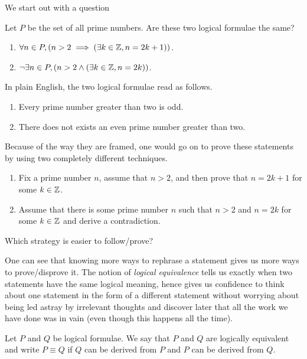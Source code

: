 We start out with a question
\begin{question}
    Let $P$ be the set of all prime numbers.
   Are these two logical formulae the same?
   \begin{enumerate}
       \item $\forall n \in P, (n> 2 \implies (\exists k \in \mathbb{Z}, n = 2k+ 1))$.
       \item $\neg \exists n \in P, (n> 2 \wedge ( \exists k \in \mathbb{Z}, n = 2k))$.
   \end{enumerate}
\end{question}
In plain English, the two logical formulae read as follows.
\begin{enumerate}
    \item Every prime number greater than two is odd.
    \item There does not exists an even prime number greater than two.
\end{enumerate}

Because of the way they are framed, one would go on  to prove these statements
by using two completely different techniques.
\begin{enumerate}
    \item Fix a prime number $n$, assume that $n>2$, and then prove that $n = 2k+ 1$
        for some $k\in \mathbb{Z}$.
    \item Assume that there is some prime number $n$ such that $n>2$ and $n=2k$ for some
        $k \in \mathbb{Z}$ and derive a contradiction.
\end{enumerate}
\begin{question}
   Which strategy is easier to follow/prove?
\end{question}

One can see that knowing more ways to rephrase a statement gives us more ways to
prove/disprove it.
The notion of \emph{logical equivalence} tells us exactly when two statements 
have the same logical meaning, hence gives us confidence to think about one
statement in the form of a different statement
without worrying about being led astray by irrelevant thoughts and discover
later that all the work we have done was in vain (even though this happens all the time).

\begin{definition}
    Let $P$ and $Q$ be logical formulae.
    We say that $P$ and $Q$ are logically equivalent and write $P\equiv Q$
    if $Q$ can be derived from $P$ and $P$ can be derived from $Q$.
\end{definition}


